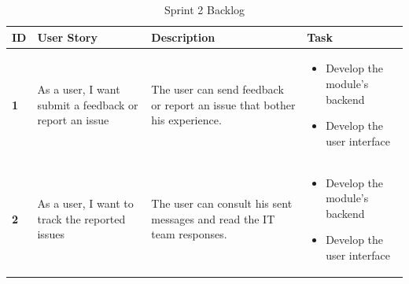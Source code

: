 \begin{table}[H]
    \renewcommand{\arraystretch}{1.2}
    \setlength{\belowcaptionskip}{0.25cm}
 
   \begin{tabular}{|p{}|p{}|p{}|p{}|}
   \hline
   \textbf{ID}  &  \textbf{User Story } & \textbf{Description} & \textbf{Task} \\ \hline


   
   \begin{center}
       \textbf{1}
   \end{center} & \begin{center}
       As a user, I want submit a feedback or report an issue
   \end{center} &
   \begin{center}
   The user can send feedback or report an issue that bother his experience.
   \end{center} &
       \begin{itemize}[left=0pt, label={\textbf{\Huge .}}]
            \item Develop the module's backend 
            \item Develop the user interface 
        \end{itemize} \\ \hline
   \begin{center}
       \textbf{2}
   \end{center} & \begin{center}
       As a  user, I want to track the reported issues 
   \end{center} &
   \begin{center}
       
  The  user can consult his sent messages and read the IT team responses.\end{center}
  & 
       \begin{itemize}[left=0pt, label={\textbf{\Huge .}}]
            \item Develop the module's backend 
            \item Develop the user interface 
        \end{itemize} \\ \hline
\end{tabular}
       \caption{Sprint 2 Backlog}
        \label{tab:my_label}
\end{table}
\newpage

